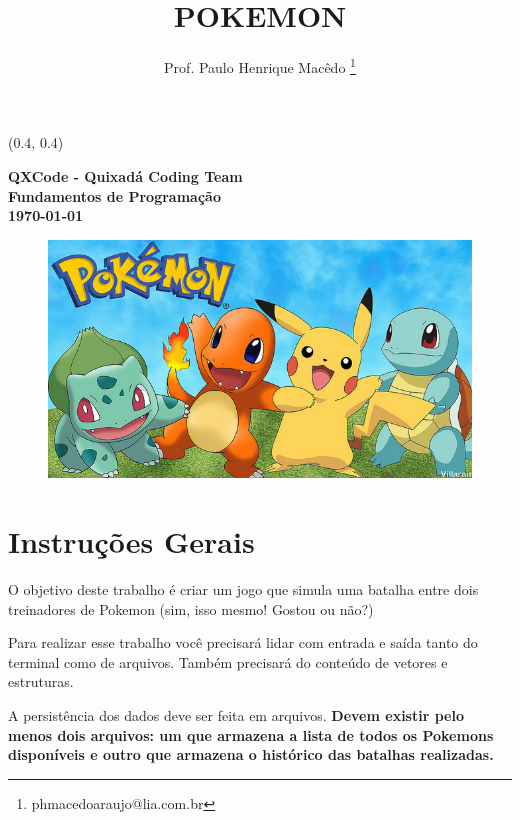 \documentclass[12pt]{article}
\renewcommand{\bf}[1]{\textbf{#1}}
\begin{document}

\begin{textblock}{15}(0.4, 0.4)
\noindent
\begin{center}
\LARGE{\bf{QXCode - Quixadá Coding Team}}\\
\large{\bf{Fundamentos de Programação}} \\
\large{\bf{\today}}
\end{center}
\end{textblock}

\title{\bf{POKEMON}}

\author{
Prof. Paulo Henrique Macêdo \thanks{phmacedoaraujo@lia.com.br}
}

\date{}

\maketitle
\thispagestyle{empty}


\begin{figure}[h!]
\centering
\includegraphics[width=0.4\linewidth]{imagens/pokemon}
\label{fig:pokemon}
\end{figure}

\section{Instruções Gerais}
O objetivo deste trabalho é criar um jogo que simula uma batalha entre dois treinadores de Pokemon (sim, isso mesmo! Gostou ou não?)

Para realizar esse trabalho você precisará lidar com entrada e saída tanto do terminal como de arquivos. Também precisará do conteúdo de vetores e estruturas.

A persistência dos dados deve ser feita em arquivos. \textbf{Devem existir pelo menos dois arquivos: um que armazena a lista de todos os Pokemons disponíveis e outro que armazena o histórico das batalhas realizadas.}
\end{document}

